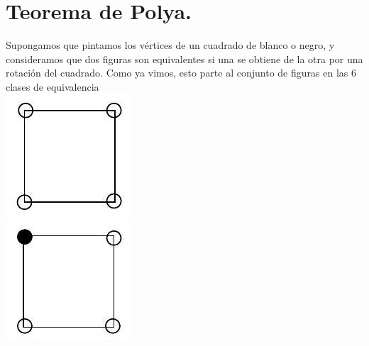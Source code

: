 \documentclass[10pt]{article}
\begin{document}
\section*{Teorema de Polya.}
Supongamos que pintamos los vértices de un cuadrado de blanco o negro, y consideramos que dos figuras son equivalentes si una se obtiene de la otra por una rotación del cuadrado. Como ya vimos, esto parte al conjunto de figuras en las 6 clases de equivalencia\\
\includegraphics[max width=\textwidth, center]{2025_09_05_3ba26226ec0baddb5a03g-56(2)}\\
\includegraphics[max width=\textwidth, center]{2025_09_05_3ba26226ec0baddb5a03g-56(5)}\\
\end{document}
